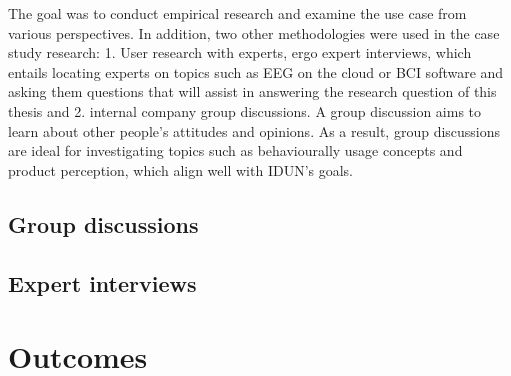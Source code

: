 The goal was to conduct empirical research and examine the use case from various perspectives. In addition, two other methodologies were used in the case study research: 1. User research with experts, ergo expert interviews, which entails locating experts on topics such as EEG on the cloud or BCI software and asking them questions that will assist in answering the research question of this thesis and 2. internal company group discussions. A group discussion aims to learn about other people's attitudes and opinions. As a result, group discussions are ideal for investigating topics such as behaviourally usage concepts and product perception, which align well with IDUN's goals.




\subsection{Group discussions}
\label{chapter3-group-discussions}

\subsection{Expert interviews}
\label{chapter3-expert-interviews}

\section{Outcomes}
\label{chapter3-outcomes}

